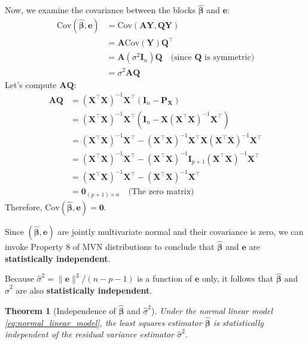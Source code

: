 \documentclass[11pt, letterpaper]{article}
\theoremstyle{plain} %
\newtheorem{theorem}{Theorem}[section]
\theoremstyle{definition} %
\theoremstyle{remark} %
\renewcommand{\mathbf}{\boldsymbol} %
\newcommand{\Cov}{\mathrm{Cov}} %
\newcommand{\I}{\mathbf{I}} %
\begin{document}
Now, we examine the covariance between the blocks $\hat{\boldsymbol{\beta}}$ and $\boldsymbol{e}$:
\begin{align*}
\Cov(\hat{\boldsymbol{\beta}}, \boldsymbol{e}) &= \Cov(\boldsymbol{A}\boldsymbol{Y}, \boldsymbol{Q}\boldsymbol{Y}) \\
&= \boldsymbol{A} \Cov(\boldsymbol{Y}) \boldsymbol{Q}^{\top} \\
&= \boldsymbol{A} (\sigma^2 \I_n) \boldsymbol{Q} \quad \text{(since } \boldsymbol{Q} \text{ is symmetric)} \\
&= \sigma^2 \boldsymbol{A}\boldsymbol{Q}
\end{align*}
Let's compute $\boldsymbol{A}\boldsymbol{Q}$:
\begin{align*}
\boldsymbol{A}\boldsymbol{Q} &= (\boldsymbol{X}^{\top}\boldsymbol{X})^{-1}\boldsymbol{X}^{\top} (\I_n - \boldsymbol{P_X}) \\
&= (\boldsymbol{X}^{\top}\boldsymbol{X})^{-1}\boldsymbol{X}^{\top} (\I_n - \boldsymbol{X}(\boldsymbol{X}^{\top}\boldsymbol{X})^{-1}\boldsymbol{X}^{\top}) \\
&= (\boldsymbol{X}^{\top}\boldsymbol{X})^{-1}\boldsymbol{X}^{\top} - (\boldsymbol{X}^{\top}\boldsymbol{X})^{-1}\boldsymbol{X}^{\top} \boldsymbol{X}(\boldsymbol{X}^{\top}\boldsymbol{X})^{-1}\boldsymbol{X}^{\top} \\
&= (\boldsymbol{X}^{\top}\boldsymbol{X})^{-1}\boldsymbol{X}^{\top} - (\boldsymbol{X}^{\top}\boldsymbol{X})^{-1} \I_{p+1} (\boldsymbol{X}^{\top}\boldsymbol{X})^{-1}\boldsymbol{X}^{\top} \\
&= (\boldsymbol{X}^{\top}\boldsymbol{X})^{-1}\boldsymbol{X}^{\top} - (\boldsymbol{X}^{\top}\boldsymbol{X})^{-1}\boldsymbol{X}^{\top} \\
&= \mathbf{0}_{(p+1) \times n} \quad \text{(The zero matrix)}
\end{align*}
Therefore, $\Cov(\hat{\boldsymbol{\beta}}, \boldsymbol{e}) = \mathbf{0}$.

Since $(\hat{\boldsymbol{\beta}}, \boldsymbol{e})$ are jointly multivariate normal and their covariance is zero, we can invoke Property 8 of MVN distributions to conclude that $\hat{\boldsymbol{\beta}}$ and $\boldsymbol{e}$ are \textbf{statistically independent}.

Because $\hat{\sigma}^2 = \|\boldsymbol{e}\|^2 / (n-p-1)$ is a function of $\boldsymbol{e}$ only, it follows that $\hat{\boldsymbol{\beta}}$ and $\hat{\sigma}^2$ are also \textbf{statistically independent}.

\begin{theorem}[Independence of $\hat{\boldsymbol{\beta}}$ and $\hat{\sigma}^2$]
Under the normal linear model \eqref{eq:normal_linear_model}, the least squares estimator $\hat{\boldsymbol{\beta}}$ is statistically independent of the residual variance estimator $\hat{\sigma}^2$.
\end{theorem}
\end{document}
